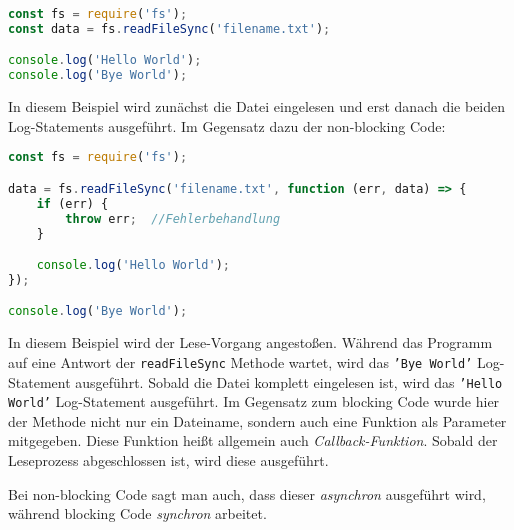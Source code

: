  \begin{lstlisting}[title=Blocking Code bei dem Einlesen einer Datei, language=JavaScript]
const fs = require('fs');
const data = fs.readFileSync('filename.txt');

console.log('Hello World');
console.log('Bye World');
\end{lstlisting}

In diesem Beispiel wird zunächst die Datei eingelesen und erst danach die beiden Log-Statements ausgeführt. Im Gegensatz dazu der non-blocking Code: \\

\noindent
\begin{minipage}{\linewidth}
\begin{lstlisting}[title=Non-blocking Code beim Einlesen einer Datei, language=JavaScript]
const fs = require('fs');

data = fs.readFileSync('filename.txt', function (err, data) => {
	if (err) {
		throw err;  //Fehlerbehandlung
	}

	console.log('Hello World');
});

console.log('Bye World');

\end{lstlisting}
\end{minipage}

In diesem Beispiel wird der Lese-Vorgang angestoßen. Während das Programm auf eine Antwort der \texttt{readFileSync} Methode wartet, wird das \texttt{'Bye World'} Log-Statement ausgeführt. Sobald die Datei komplett eingelesen ist, wird das \texttt{'Hello World'} Log-Statement ausgeführt. Im Gegensatz zum blocking Code wurde hier der Methode nicht nur ein Dateiname, sondern auch eine Funktion als Parameter mitgegeben. Diese Funktion heißt allgemein auch \textit{Callback-Funktion}. Sobald der Leseprozess abgeschlossen ist, wird diese ausgeführt.

Bei non-blocking Code sagt man auch, dass dieser \textit{asynchron} ausgeführt wird, während blocking Code \textit{synchron} arbeitet.




